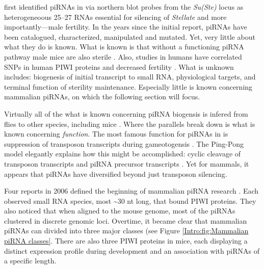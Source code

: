 {    \citet{Aravin2001} first identified piRNAs in \flies{} via northern blot probes from the \textit{Su(Ste)} locus as heterogeneoous 25--27 RNAs essential for silencing of \textit{Stellate} and more importantly---male fertility. In the years since the initial report, piRNAs have been catalogued, characterized, manipulated and mutated. Yet, very little about what they do is known. What is known is that without a functioning piRNA pathway male mice are also sterile \citep{Deng2002c,Kuramochi-Miyagawa2004}. Also, studies in humans have correlated SNPs in human PIWI proteins and decreased fertility \citep{Gu2010a}. What is unknown includes: biogenesis of initial transcript to small RNA, physiological targets, and terminal function of sterility maintenance. Especially little is known concerning mammalian piRNAs, on which the following section will focus.

    Virtually all of the what is known concerning piRNA biogensis is infered from flies to other species, including mice \citep{Siomi2011,Luteijn2013,Hirose2014}. Where the parallels break down is what is known concerning \textit{function}. The most famous function for piRNAs in \flies{} is suppression of transposon transcripts during gameotogensis \citep{Malone2009}. The Ping-Pong model elegantly explains how this might be accomplished: cyclic cleavage of transposon transcripts and piRNA precursor transcripts \citep{Brennecke2007,Gunawardane2007}. Yet for mammals, it appears that piRNAs have diversified beyond just transposon silencing.

    Four reports in 2006 defined the beginning of mammalian piRNA research \citep{Aravin2006,Grivna2006,Girard2006,Lau2006}. Each observed small RNA species, most \textasciitilde30 nt long, that bound PIWI proteins. They also noticed that when aligned to the mouse genome, most of the piRNAs clustered in discrete genomic loci. Overtime, it became clear that mammalian piRNAs can divided into three major classes (see Figure \ref{Intro:fig:Mammalian piRNA classes}. There are also three PIWI proteins in mice, each displaying a distinct expression profile during development and an association with piRNAs of a specific length. 

}
